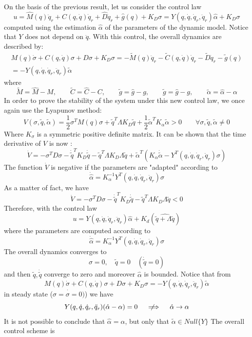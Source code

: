\documentclass{book}
\newcommand{\notimplies}{%
  \mathrel{{\ooalign{\hidewidth$\not\phantom{=}$\hidewidth\cr$\implies$}}}}
\begin{document}
On the basis of the previous result, let us consider the control law 
\[
    u = \hat{M}(q)\ddot{q}_r+\hat{C}(q,\dot{q})\dot{q}_r+\hat{D}\dot{q}_r+\hat{g}(q)+K_D\sigma = Y(q,\dot{q},\dot{q}_r,\ddot{q}_r)\hat{\alpha}+K_D\sigma
\]
computed using the estimation $\hat{\alpha}$ of the parameters of the dynamic model.
Notice that $Y$ does not depend on $\ddot{q}$. 
With this control, the overall dynamics are described by:
\begin{gather*}
    M(q)\dot{\sigma}+C(q,\dot{q})\sigma+D\sigma+K_D\sigma=-\tilde{M}(q)\ddot{q}_r-\tilde{C}(q,\dot{q})\dot{q}_r-\tilde{D}\dot{q}_r-\tilde{g}(q)\\
    =-Y(q,\dot{q},\dot{q}_r,\ddot{q}_r)\tilde{\alpha}
\end{gather*}
where
\[
    \tilde{M}=\hat{M}-M, \qquad \tilde{C}=\hat{C}-C, \qquad \tilde{g}=\hat{g}-g, \qquad \tilde{g}=\hat{g}-g, \qquad \tilde{\alpha}=\hat{\alpha}-\alpha 
\]
In order to prove the stability of the system under this new control law, we once again use the Lyapunov method: 
\[
    V(\sigma,\tilde{q},\tilde{\alpha})=\displaystyle\frac{1}{2}\sigma^TM(q)\sigma+\tilde{q}^T\Lambda K_D\tilde{q}+\displaystyle\frac{1}{2}\tilde{\alpha}^TK_\alpha \tilde{\alpha}>0 \qquad \forall \sigma,\tilde{q},\tilde{\alpha}\neq 0
\]
Where $K_\sigma$ is a symmetric positive definite matrix. It can be shown that the time derivative of $V$ is now : 
\[
    \dot{V}=-\sigma^TD\sigma-\dot{\tilde{q}}^TK_D\dot{\tilde{q}}-\tilde{q}^T\Lambda K_D \Lambda\tilde{q} + \tilde{\alpha}^T(K_\alpha\dot{\tilde{\alpha}}-Y^T(q,\dot{q},\dot{q}_r,\ddot{q}_r)\sigma)
\]
The function $\dot{V}$ is negative if the parameters are "adapted" according to 
\[
    \dot{\hat{\alpha}}=K_\alpha^{-1}Y^T(q,\dot{q},\dot{q}_r,\ddot{q}_r)\sigma
\]
As a matter of fact, we have 
\[
    \dot{V}=-\sigma^TD\sigma-\dot{\tilde{q}}^TK_D\dot{\tilde{q}}-\tilde{q}^T\Lambda K_D\Lambda\tilde{q}<0
\]
Therefore, with the control law 
\[
    u=Y(q,\dot{q},\dot{q}_r,\ddot{q}_r)\hat{\alpha}+K_d(\hat{\tilde{q}+\Lambda\tilde{q}})
\]
where the parameters are computed according to 
\[
    \dot{\hat{\alpha}}=K_\alpha^{-1}Y^T(q,\dot{q},\dot{q}_r,\ddot{q}_r)\sigma
\]
The overall dynamics converges to 
\[
    \sigma=0,\quad \tilde{q}=0 \quad (\dot{\tilde{q}}=0)
\]
and then $\tilde{q},\dot{\tilde{q}}$ converge to zero and moreover $\hat{\alpha}$ is bounded. Notice that from 
\[
    M(q)\dot{\sigma}+C(q,\dot{q})\sigma+D\sigma+K_D\sigma=- Y(q,\dot{q},\dot{q}_r,\ddot{q}_r)\tilde{\alpha}
\]
in steady state ($\dot{\sigma=\sigma=0)}$) we have 
\[
    Y(q,\dot{q},\dot{q}_r,\ddot{q}_r)(\hat{\alpha}-\alpha)=0\quad \notimplies \quad \hat{\alpha}\to\alpha
\]
It is not possible to conclude that $\hat{\alpha}=\alpha$, but only that $\tilde{\alpha}\in Null\{Y\}$
The overall control scheme is 
\end{document}
